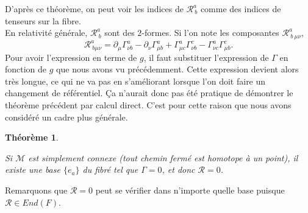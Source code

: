 \documentclass[a4paper,11pt]{report}
\theoremstyle{definition}
\theoremstyle{plain}
\newtheorem{thm}{Théorème}[chapter]
\theoremstyle{definition}
\theoremstyle{remark}
\newcommand{\M}{\mathscr{M}}
\newcommand{\p}{\partial}
\begin{document}
                D'après ce théorème, on peut voir les indices de $\mathscr{R}^a_{~b}$ comme des indices de tenseurs sur la fibre.\\
                
                En relativité générale, $\mathscr{R}^a_{~b}$ sont des $2$-formes. Si l'on note les composantes $\mathscr{R}^a_{~b~\mu\nu}$, 
                \begin{equation}
                    \mathscr{R}^a_{~b\mu\nu} = \p_\mu\Gamma^a_{\nu b}-\p_\nu\Gamma^a_{\mu b} + \Gamma^a_{\mu c}\Gamma^c_{\nu b}-\Gamma^a_{\nu c}\Gamma^c_{\mu b}.
                \end{equation}
                Pour avoir l'expression en terme de $g$, il faut substituer l'expression de $\Gamma$ en fonction de $g$ que nous avons vu précédemment. Cette expression devient alors très longue, ce qui ne va pas en s'améliorant lorsque l'on doit faire un changement de référentiel. Ça n'aurait donc pas été pratique de démontrer le théorème précédent par calcul direct. C'est pour cette raison que nous avons considéré un cadre plus générale.
                
                \begin{thm}\begin{leftbar}
                    Si $\M$ est simplement connexe (tout chemin fermé est homotope à un point), il existe une base $\{e_a\}$ du fibré tel que $\Gamma = 0$, et donc $\mathscr{R} = 0$.
                \end{leftbar}\end{thm}
                
                Remarquons que $\mathscr{R} = 0$ peut se vérifier dans n'importe quelle base puisque $\mathscr{R}\in End(F)$.
                
\end{document}
